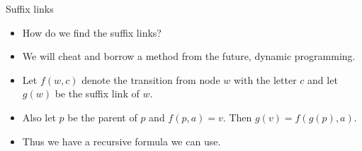 \documentclass{beamer}
\begin{document}
\begin{frame}[plain]{Suffix links}
	\begin{itemize}
        \item How do we find the suffix links?
        \item We will cheat and borrow a method from the future, dynamic programming.
        \item Let $f(w, c)$ denote the transition from node $w$ with the letter $c$ and let $g(w)$ be the suffix link of $w$.
        \item Also let $p$ be the parent of $p$ and $f(p, a) = v$. Then $g(v) = f(g(p), a)$.
        \item Thus we have a recursive formula we can use.
    \end{itemize}
\end{frame}
\end{document}
